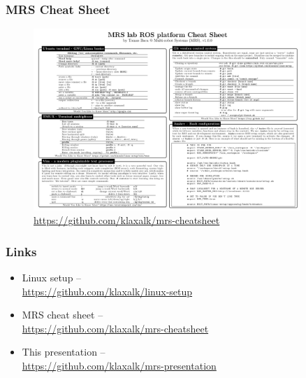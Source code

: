 \documentclass{beamer}
\begin{document}
\begin{frame}
  \frametitle{MRS Cheat Sheet}

  \begin{figure}
    \caption*{\url{https://github.com/klaxalk/mrs-cheatsheet}}
    \includegraphics[width=0.9\textwidth]{./fig/mrs_cheatsheet.png}
  \end{figure}

\end{frame}

\begin{frame}
  \frametitle{Links}

  \begin{itemize}
    \item Linux setup -- \\\url{https://github.com/klaxalk/linux-setup}
    \item MRS cheat sheet -- \\\url{https://github.com/klaxalk/mrs-cheatsheet}
    \item This presentation -- \\\url{https://github.com/klaxalk/mrs-presentation}
  \end{itemize}

\end{frame}

\end{document}
